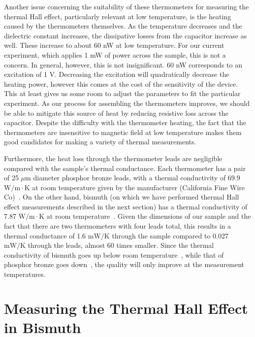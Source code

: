 \documentclass{thesis-umich}
\begin{document}
Another issue concerning the suitability of these thermometers for measuring the
thermal Hall effect, particularly relevant at low temperature, is the heating
caused by the thermometers themselves. As the temperature decreases and the
dielectric constant increases, the dissipative losses from the capacitor
increase as well. These increase to about 60 nW at low temperature. For our
current experiment, which applies 1 mW of power across the sample, this is not a
concern. In general, however, this is not insignificant. 60 nW corresponds to an
excitation of 1 V. Decreasing the excitation will quadratically decrease the
heating power, however this comes at the cost of the sensitivity of the device.
This at least gives us some room to adjust the parameters to fit the particular
experiment. As our process for assembling the thermometers improves, we should
be able to mitigate this source of heat by reducing resistive loss across the
capacitor.  Despite the difficulty with the thermometer heating, the fact that
the thermometers are insensitive to magnetic field at low temperature makes them
good candidates for making a variety of thermal measurements.

Furthermore, the heat loss through the thermometer leads are negligible compared
with the sample's thermal conductance. Each thermometer has a pair of 25 $\mu$m
diameter phosphor bronze leads, with a thermal conductivity of 69.9 $\mathrm{W/m
  \cdot K}$ at room temperature given by the manufacturer (California Fine Wire
  Co)~\cite{CFW}. On the other hand, bismuth (on which we have performed thermal Hall effect measurements described in the next section) has a thermal conductivity of 7.87
  $\mathrm{W/m\cdot K}$ at room temperature~\cite{Ekin2006}.  Given the dimensions
  of our sample and the fact that there are two thermometers with four leads
  total, this results in a thermal conductance of 1.6 $\mathrm{mW/K}$ through
  the sample compared to 0.027 $\mathrm{mW/K}$ through the leads, almost 60
  times smaller. Since the thermal conductivity of bismuth goes up below room
  temperature~\cite{White1958}, while that of phosphor bronze goes
  down~\cite{Ekin2006}, the quality will only improve at the measurement
  temperatures.


\section{Measuring the Thermal Hall Effect in Bismuth}
\end{document}
